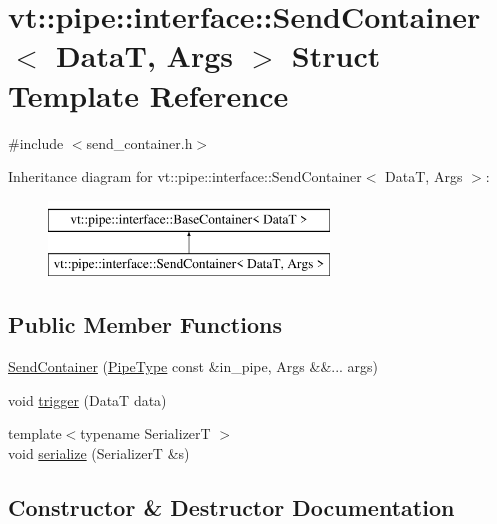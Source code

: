 \hypertarget{structvt_1_1pipe_1_1interface_1_1_send_container}{}\section{vt\+:\+:pipe\+:\+:interface\+:\+:Send\+Container$<$ DataT, Args $>$ Struct Template Reference}
\label{structvt_1_1pipe_1_1interface_1_1_send_container}


{\ttfamily \#include $<$send\+\_\+container.\+h$>$}

Inheritance diagram for vt\+:\+:pipe\+:\+:interface\+:\+:Send\+Container$<$ DataT, Args $>$\+:\begin{figure}[H]
\begin{center}
\leavevmode
\includegraphics[height=2.000000cm]{structvt_1_1pipe_1_1interface_1_1_send_container}
\end{center}
\end{figure}
\subsection*{Public Member Functions}
\begin{DoxyCompactItemize}
\item 
\hyperlink{structvt_1_1pipe_1_1interface_1_1_send_container_a8183aa3cc7165532ffc3b418316d0793}{Send\+Container} (\hyperlink{namespacevt_ac9852acda74d1896f48f406cd72c7bd3}{Pipe\+Type} const \&in\+\_\+pipe, Args \&\&... args)
\item 
void \hyperlink{structvt_1_1pipe_1_1interface_1_1_send_container_a7999c0e12e4a3fc495df87de2ced8ab0}{trigger} (DataT data)
\item 
{\footnotesize template$<$typename SerializerT $>$ }\\void \hyperlink{structvt_1_1pipe_1_1interface_1_1_send_container_a0527bd5f83ac4292051997a03faff60a}{serialize} (SerializerT \&s)
\end{DoxyCompactItemize}


\subsection{Constructor \& Destructor Documentation}
\mbox{\label{structvt_1_1pipe_1_1interface_1_1_send_container_a8183aa3cc7165532ffc3b418316d0793}} 

